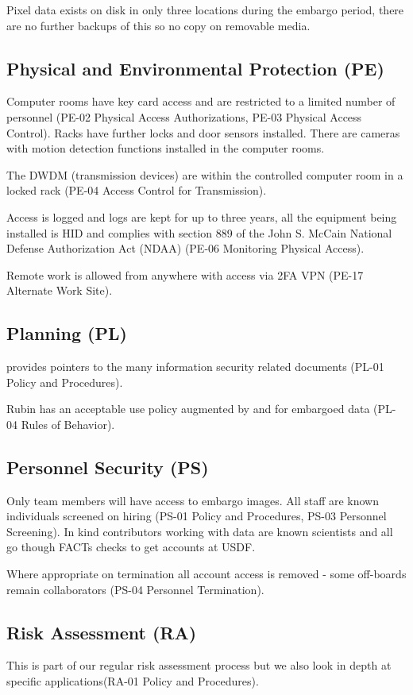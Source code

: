 Pixel data exists on disk in only three locations during the embargo period, there are no further backups of this so no copy on removable media.

\subsection{Physical and Environmental Protection (PE)} \label{sec:PE}
Computer rooms have key card access and are restricted to a limited number of personnel (PE-02  Physical Access Authorizations, PE-03  Physical Access Control).
Racks have further locks and door sensors installed.
There are cameras with motion detection functions installed in the computer rooms.

The DWDM (transmission devices) are within the controlled computer room in a locked rack (PE-04  Access Control for Transmission).

Access is logged and logs are kept for up to three years, all the equipment being installed is HID and complies with section 889 of the John S. McCain National Defense Authorization Act (NDAA) (PE-06  Monitoring Physical Access).

Remote work is allowed  from anywhere with access via 2FA VPN (PE-17  Alternate Work Site).

\subsection{Planning (PL)} \label{sec:PL}
 provides pointers to the many information security related documents (PL-01  Policy and Procedures).

Rubin has an acceptable use policy  augmented by   and  for embargoed data  (PL-04  Rules of Behavior).

\subsection{Personnel Security (PS)} \label{sec:PS}
Only  team members will have access to embargo images.
All staff are known individuals screened on hiring (PS-01  Policy and Procedures, PS-03  Personnel Screening).
In kind contributors working with data  are known scientists and all go though FACTs checks to get accounts at USDF.

Where appropriate on termination all account access is removed - some off-boards remain collaborators (PS-04  Personnel Termination).


\subsection{Risk Assessment (RA)} \label{sec:RA}
This is part of our regular risk assessment process  but we also look in depth at specific applications(RA-01  Policy and Procedures).

